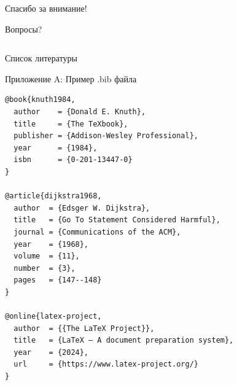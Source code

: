 \documentclass[aspectratio=169, 12pt]{beamer}
\begin{document}
\begin{frame}[plain]
  \begin{center}
    \Huge \textcolor{myblue}{Спасибо за внимание!}
    
    \vspace{1cm}
    
    \Large \textcolor{mygreen}{Вопросы?}
    
    \vspace{2cm}
    
    \normalsize
    \begin{tabular}{rl}
     \end{tabular}
  \end{center}
\end{frame}

\begin{frame}[allowframebreaks]{Список литературы}
  \printbibliography[heading=none]
\end{frame}

\appendix

\begin{frame}[fragile]{Приложение A: Пример .bib файла}
  \begin{lstlisting}[basicstyle=\ttfamily\tiny]
@book{knuth1984,
  author    = {Donald E. Knuth},
  title     = {The TeXbook},
  publisher = {Addison-Wesley Professional},
  year      = {1984},
  isbn      = {0-201-13447-0}
}

@article{dijkstra1968,
  author  = {Edsger W. Dijkstra},
  title   = {Go To Statement Considered Harmful},
  journal = {Communications of the ACM},
  year    = {1968},
  volume  = {11},
  number  = {3},
  pages   = {147--148}
}

@online{latex-project,
  author  = {{The LaTeX Project}},
  title   = {LaTeX – A document preparation system},
  year    = {2024},
  url     = {https://www.latex-project.org/}
}
  \end{lstlisting}
\end{frame}
\end{document}
